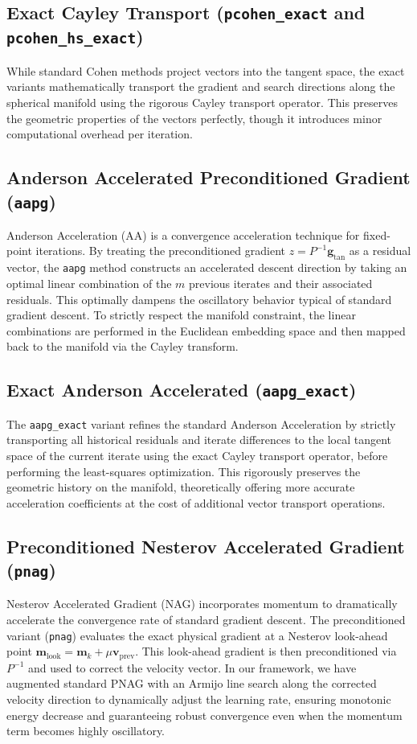 \documentclass[11pt,a4paper]{article}
\begin{document}
\subsection{Exact Cayley Transport (\texttt{pcohen\_exact} and \texttt{pcohen\_hs\_exact})}
While standard Cohen methods project vectors into the tangent space, the exact variants mathematically transport the gradient and search directions along the spherical manifold using the rigorous Cayley transport operator. This preserves the geometric properties of the vectors perfectly, though it introduces minor computational overhead per iteration.

\subsection{Anderson Accelerated Preconditioned Gradient (\texttt{aapg})}
Anderson Acceleration (AA) is a convergence acceleration technique for fixed-point iterations. By treating the preconditioned gradient $z = P^{-1} \mathbf{g}_{\text{tan}}$ as a residual vector, the \texttt{aapg} method constructs an accelerated descent direction by taking an optimal linear combination of the $m$ previous iterates and their associated residuals. This optimally dampens the oscillatory behavior typical of standard gradient descent. To strictly respect the manifold constraint, the linear combinations are performed in the Euclidean embedding space and then mapped back to the manifold via the Cayley transform. 

\subsection{Exact Anderson Accelerated (\texttt{aapg\_exact})}
The \texttt{aapg\_exact} variant refines the standard Anderson Acceleration by strictly transporting all historical residuals and iterate differences to the local tangent space of the current iterate using the exact Cayley transport operator, before performing the least-squares optimization. This rigorously preserves the geometric history on the manifold, theoretically offering more accurate acceleration coefficients at the cost of additional vector transport operations.

\subsection{Preconditioned Nesterov Accelerated Gradient \cite{Nesterov1983} (\texttt{pnag})}
Nesterov Accelerated Gradient (NAG) incorporates momentum to dramatically accelerate the convergence rate of standard gradient descent. The preconditioned variant (\texttt{pnag}) evaluates the exact physical gradient at a Nesterov look-ahead point $\mathbf{m}_{\text{look}} = \mathbf{m}_k + \mu \mathbf{v}_{\text{prev}}$. This look-ahead gradient is then preconditioned via $P^{-1}$ and used to correct the velocity vector. In our framework, we have augmented standard PNAG with an Armijo line search along the corrected velocity direction to dynamically adjust the learning rate, ensuring monotonic energy decrease and guaranteeing robust convergence even when the momentum term becomes highly oscillatory.
\end{document}

